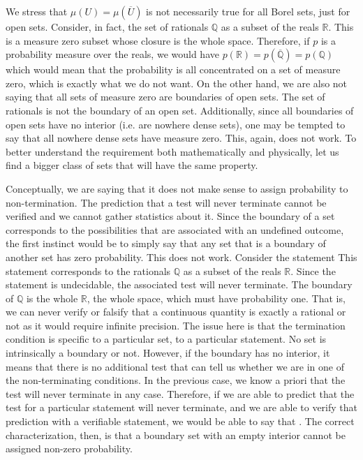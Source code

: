 We stress that $\mu(U) = \mu(\overline{U})$ is not necessarily true for all Borel sets, just for open sets. Consider, in fact, the set of rationals $\mathbb{Q}$ as a subset of the reals $\mathbb{R}$. This is a measure zero subset whose closure is the whole space. Therefore, if $p$ is a probability measure over the reals, we would have $p(\mathbb{R}) = p(\overline{\mathbb{Q}}) = p(\mathbb{Q})$ which would mean that the probability is all concentrated on a set of measure zero, which is exactly what we do not want. On the other hand, we are also not saying that all sets of measure zero are boundaries of open sets. The set of rationals is not the boundary of an open set. Additionally, since all boundaries of open sets have no interior (i.e. are nowhere dense sets), one may be tempted to say that all nowhere dense sets have measure zero. This, again, does not work. To better understand the requirement both mathematically and physically, let us find a bigger class of sets that will have the same property.

Conceptually, we are saying that it does not make sense to assign probability to non-termination. The prediction that a test will never terminate cannot be verified and we cannot gather statistics about it. Since the boundary of a set corresponds to the possibilities that are associated with an undefined outcome, the first instinct would be to simply say that any set that is a boundary of another set has zero probability. This does not work. Consider the statement  This statement corresponds to the rationals $\mathbb{Q}$ as a subset of the reals $\mathbb{R}$. Since the statement is undecidable, the associated test will never terminate. The boundary of $\mathbb{Q}$ is the whole $\mathbb{R}$, the whole space, which must have probability one. That is, we can never verify or falsify that a continuous quantity is exactly a rational or not as it would require infinite precision. The issue here is that the termination condition is specific to a particular set, to a particular statement. No set is intrinsically a boundary or not. However, if the boundary has no interior, it means that there is no additional test that can tell us whether we are in one of the non-terminating conditions. In the previous case, we know a priori that the test will never terminate in any case. Therefore, if we are able to predict that the test for a particular statement will never terminate, and we are able to verify that prediction with a verifiable statement, we would be able to say that . The correct characterization, then, is that a boundary set with an empty interior cannot be assigned non-zero probability.

